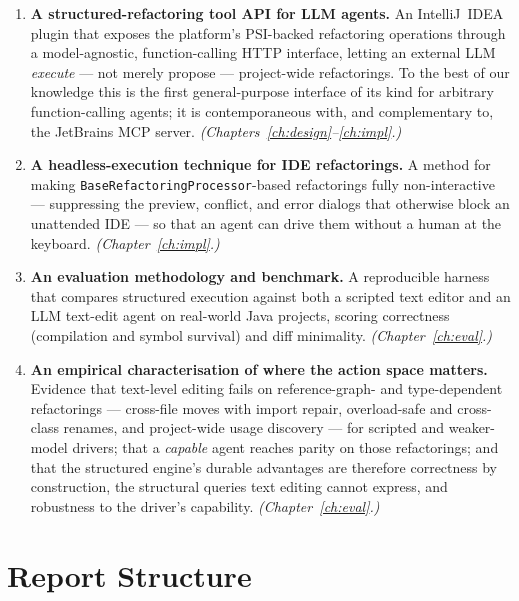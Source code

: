 \begin{enumerate}
  \item \textbf{A structured-refactoring tool API for LLM agents.} An
  IntelliJ~IDEA plugin that exposes the platform's PSI-backed refactoring
  operations through a model-agnostic, function-calling HTTP interface, letting
  an external LLM \emph{execute} --- not merely propose --- project-wide
  refactorings. To the best of our knowledge this is the first general-purpose
  interface of its kind for arbitrary function-calling agents; it is
  contemporaneous with, and complementary to, the JetBrains MCP server.
  \emph{(Chapters~\ref{ch:design}--\ref{ch:impl}.)}

  \item \textbf{A headless-execution technique for IDE refactorings.} A method
  for making \texttt{BaseRefactoringProcessor}-based refactorings fully
  non-interactive --- suppressing the preview, conflict, and error dialogs that
  otherwise block an unattended IDE --- so that an agent can drive them without
  a human at the keyboard. \emph{(Chapter~\ref{ch:impl}.)}

  \item \textbf{An evaluation methodology and benchmark.} A reproducible harness
  that compares structured execution against both a scripted text editor and an
  LLM text-edit agent on real-world Java projects, scoring correctness
  (compilation and symbol survival) and diff minimality.
  \emph{(Chapter~\ref{ch:eval}.)}

  \item \textbf{An empirical characterisation of where the action space matters.}
  Evidence that text-level editing fails on reference-graph- and type-dependent
  refactorings --- cross-file moves with import repair, overload-safe and cross-class
  renames, and project-wide usage discovery --- for scripted and weaker-model drivers;
  that a \emph{capable} agent reaches parity on those refactorings; and that the
  structured engine's durable advantages are therefore correctness by construction, the
  structural queries text editing cannot express, and robustness to the driver's
  capability. \emph{(Chapter~\ref{ch:eval}.)}
\end{enumerate}

\section{Report Structure}
\label{sec:intro-structure}

